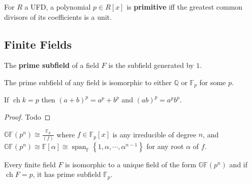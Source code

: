 \begin{definition}

For \(R\) a UFD, a polynomial \(p\in R[x]\) is \textbf{primitive} iff
the greatest common divisors of its coefficients is a unit.

\end{definition}

\hypertarget{finite-fields}{%
\subsection{Finite Fields}\label{finite-fields}}

\begin{definition}

The \textbf{prime subfield} of a field \(F\) is the subfield generated
by \(1\).

\end{definition}

\begin{theorem}

The prime subfield of any field is isomorphic to either \({\mathbb{Q}}\)
or \({\mathbb{F}}_p\) for some \(p\).

\end{theorem}

\begin{proposition}

If \(\operatorname{ch}k = p\) then \((a+b)^p = a^p + b^p\) and
\((ab)^p = a^p b^p\).

\end{proposition}

\begin{proof}

Todo

\end{proof}


\begin{theorem}

\({\mathbb{GF}}(p^n)\cong \frac{{\mathbb{F}}_p}{(f)}\) where
\(f \in {\mathbb{F}}_p[x]\) is any irreducible of degree \(n\), and
\({\mathbb{GF}}(p^n) \cong {\mathbb{F}}[\alpha] \cong {\operatorname{span}}_{\mathbb{F}}\left\{{1, \alpha, \cdots, \alpha^{n-1}}\right\}\)
for any root \(\alpha\) of \(f\).

\end{theorem}

\begin{proposition}

Every finite field \(F\) is isomorphic to a unique field of the form
\({\mathbb{GF}}(p^n)\) and if \(\operatorname{ch}F = p\), it has prime
subfield \({\mathbb{F}}_p\).

\end{proposition}

